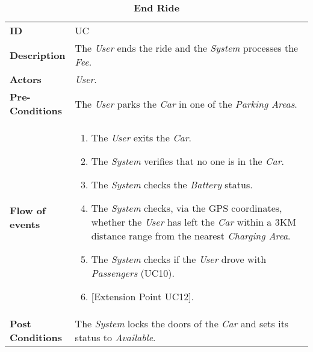 \begin{longtable}{|p{0.2\linewidth} p{0.8\linewidth}|}
	\captionsetup{labelformat=empty} %
	\caption{\textbf{End Ride}} %
	\label{UC_EndRide}%
	\\ \hline %
	
	\textbf{ID} & UC\theUseCaseIdCounter \\ \hline
	\textbf{Description} & The \emph{User} ends the ride and the \emph{System} processes the \emph{Fee}. \\ \hline
	\textbf{Actors} & \emph{User}.\\ \hline
	\textbf{Pre-Conditions} & The \emph{User} parks the \emph{Car} in one of the \emph{Parking Areas}. \\ \hline
	\textbf{Flow of events} & 
	\begin{enumerate}
		\item The \emph{User} exits the \emph{Car}.
		\item The \emph{System} verifies that no one is in the \emph{Car}.
		\item The \emph{System} checks the \emph{Battery} status. 
		\item The \emph{System} checks, via the GPS coordinates, whether the \emph{User} has left the \emph{Car} within a 3KM distance range from the nearest \emph{Charging Area}.
		\item The \emph{System} checks if the \emph{User} drove with \emph{Passengers} (UC10).
		\item {[}Extension Point UC12{]}.
	\end{enumerate}	 \\ \hline
	\textbf{Post Conditions} & The \emph{System} locks the doors of the \emph{Car} and sets its status to \emph{Available}.
	

\end{longtable}

